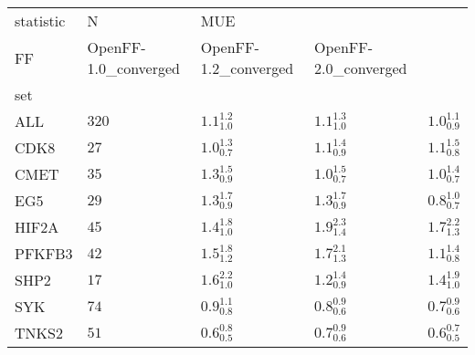 \begin{tabular}{lllll}
\toprule
statistic &      N & \multicolumn{3}{l}{MUE} \\
FF & OpenFF-1.0_converged & OpenFF-1.2_converged & OpenFF-2.0_converged \\
set    &        &                      &                      &                      \\
\midrule
ALL    &  $320$ &    $1.1_{1.0}^{1.2}$ &    $1.1_{1.0}^{1.3}$ &    $1.0_{0.9}^{1.1}$ \\
CDK8   &   $27$ &    $1.0_{0.7}^{1.3}$ &    $1.1_{0.9}^{1.4}$ &    $1.1_{0.8}^{1.5}$ \\
CMET   &   $35$ &    $1.3_{0.9}^{1.5}$ &    $1.0_{0.7}^{1.5}$ &    $1.0_{0.7}^{1.4}$ \\
EG5    &   $29$ &    $1.3_{0.9}^{1.7}$ &    $1.3_{0.9}^{1.7}$ &    $0.8_{0.7}^{1.0}$ \\
HIF2A  &   $45$ &    $1.4_{1.0}^{1.8}$ &    $1.9_{1.4}^{2.3}$ &    $1.7_{1.3}^{2.2}$ \\
PFKFB3 &   $42$ &    $1.5_{1.2}^{1.8}$ &    $1.7_{1.3}^{2.1}$ &    $1.1_{0.8}^{1.4}$ \\
SHP2   &   $17$ &    $1.6_{1.0}^{2.2}$ &    $1.2_{0.9}^{1.4}$ &    $1.4_{1.0}^{1.9}$ \\
SYK    &   $74$ &    $0.9_{0.8}^{1.1}$ &    $0.8_{0.6}^{0.9}$ &    $0.7_{0.6}^{0.9}$ \\
TNKS2  &   $51$ &    $0.6_{0.5}^{0.8}$ &    $0.7_{0.6}^{0.9}$ &    $0.6_{0.5}^{0.7}$ \\
\bottomrule
\end{tabular}
